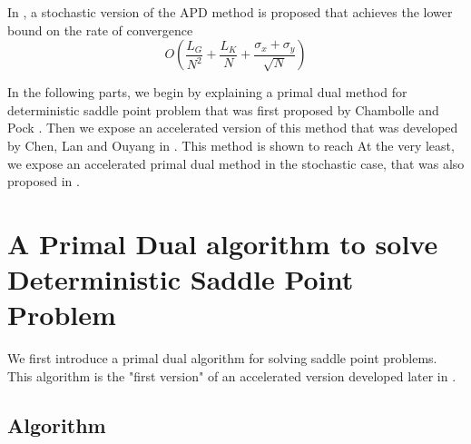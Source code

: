 \documentclass[12pt,reqno]{amsart}
\numberwithin{equation}{section}
\begin{document}
In \cite{ChenLanOuyang}, a stochastic version of the APD method is proposed that achieves the lower bound on the rate 
of convergence
$$
O(\dfrac{L_{G}}{N^{2}} + \dfrac{L_{K}}{N} + \dfrac{\sigma_{x} + \sigma_{y}}{\sqrt{N}})
$$

In the following parts, we begin by explaining a primal dual method for deterministic saddle point problem that was first proposed by 
Chambolle and Pock \cite{ChambollePock}.
Then we expose an accelerated version of this method that was developed by Chen, Lan and Ouyang in \cite{ChenLanOuyang}.
This method is shown to reach 
At the very least, we expose an accelerated primal dual method in the stochastic case, that was also proposed in \cite{ChenLanOuyang}.

%

\section{A Primal Dual algorithm to solve Deterministic Saddle Point Problem }

We first introduce a primal dual algorithm for solving saddle point problems. This algorithm is the "first version" of an accelerated version developed later
in \cite{ChenLanOuyang}.

\subsection{Algorithm}
\end{document}
